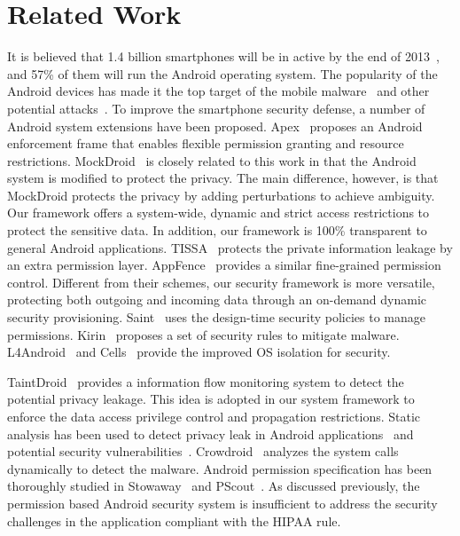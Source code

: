 \section{Related Work}
It is believed that 1.4 billion smartphones will be in active by the
end of 2013~\cite{rbiresearch}, and 57\% of them will run the Android
operating system. The popularity of the Android devices has made it
the top target of the mobile malware~\cite{Felt,Becher,xjiang_oak12}
and other potential attacks~\cite{Fahl,Lu_ccs12}. To improve the
smartphone security defense, a number of Android system extensions
\cite{Nauman,Beresford,xjiang_11,Hornyack,Ongtang,Enck_ccs09,Lange,Andrus}
have been proposed. Apex~\cite{Nauman} proposes an Android enforcement
frame that enables flexible permission granting and resource
restrictions.  MockDroid~\cite{Beresford} is closely related to this
work in that the Android system is modified to protect the privacy.
The main difference, however, is that MockDroid protects the privacy
by adding perturbations to achieve ambiguity.  Our framework
offers a system-wide, dynamic and strict access restrictions to
protect the sensitive data.  In addition, our framework is 100\%
transparent to general Android applications.  TISSA~\cite{xjiang_11}
protects the private information leakage by an extra permission
layer. AppFence~\cite{Hornyack} provides a similar fine-grained
permission control.  Different from their schemes, our security
framework is more versatile, protecting both outgoing and 
incoming data through an on-demand dynamic security provisioning.
Saint~\cite{Ongtang} uses the design-time security policies to manage 
permissions. Kirin~\cite{Enck_ccs09} proposes a set of security rules
to mitigate malware.  L4Android~\cite{Lange} and Cells~\cite{Andrus}
provide the improved OS isolation for security.  


TaintDroid~\cite{taintdroid} provides a information flow monitoring
system to detect the potential privacy leakage. This idea is adopted
in our system framework to enforce the data access privilege control
and propagation restrictions.
Static analysis has been used to detect privacy leak in Android
applications~\cite{Batyuk} and potential security
vulnerabilities~\cite{Lu_ccs12}.  Crowdroid~\cite{Burguera} analyzes
the system calls dynamically to detect the malware.  Android
permission specification has been thoroughly studied in
Stowaway~\cite{Felt_ccs11} and PScout~\cite{Au_ccs12}.  As discussed
previously, the permission based Android security system is
insufficient to address the security challenges in the application
compliant with the HIPAA rule.

